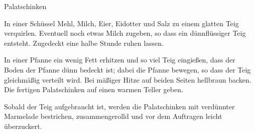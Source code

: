 \begin{recipe}[\vegetarian]{Palatschinken}

    \begin{ingredients}
    \end{ingredients}

    \begin{instructions}
        In einer Schüssel Mehl, Milch, Eier, Eidotter und Salz zu einem glatten Teig verquirlen.
        Eventuell noch etwas Milch zugeben, so dass ein dünnflüssiger Teig entsteht. 
        Zugedeckt eine halbe Stunde ruhen lassen.

        In einer Pfanne ein wenig Fett erhitzen und so viel Teig eingießen, dass der Boden der Pfanne dünn bedeckt ist; dabei die Pfanne bewegen, so dass der Teig gleichmäßig verteilt wird.
        Bei mäßiger Hitze auf beiden Seiten hellbraun backen.
        Die fertigen Palatschinken auf einen warmen Teller geben.

        Sobald der Teig aufgebraucht ist, werden die Palatschinken mit verdünnter Marmelade bestrichen, zusammengerolld und vor dem Auftragen leicht überzuckert.
    \end{instructions}
\end{recipe}
